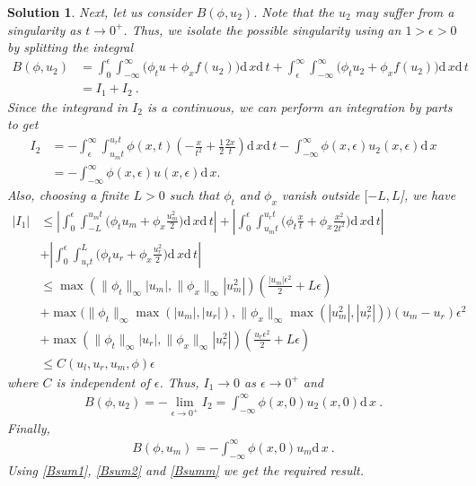 \documentclass[10pt,letterpaper]{article}
\newcommand{\dif}[1][]{\mathrm{d} {#1}\,}
\newcommand{\frb}[1]{ \left(  {#1} \right) }
\theoremstyle{break}
\newtheorem{solution}{Solution}
\begin{document}
\begin{solution}
	Next, let us consider $B\frb{\phi,u_2}$. Note that the $u_2$ may suffer from a singularity as $t \rightarrow 0^+$. Thus, we isolate the possible singularity using an $1>\epsilon > 0$ by splitting the integral
	\begin{align}
	B\frb{\phi,u_2} &=  \int_0^\epsilon \int_{-\infty}^\infty \Big(\phi_t u +\phi_x f\frb{u_2}\Big)\dif x\dif t +  \int_\epsilon^\infty \int_{-\infty}^\infty \Big(\phi_t u_2 +\phi_x f\frb{u_2}\Big)\dif x\dif t \\
	 & = I_1 + I_2 \ .
	\end{align}
	Since the integrand in $I_2$ is a continuous, we can perform an integration by parts to get
	\begin{align}
	I_2 &= - \int_\epsilon^\infty \int_{u_m t}^{u_r t} \phi(x,t) \left( - \frac{x}{t^2} + \frac{1}{2} \frac{2 x}{t} \right) \dif x \dif t - \int_{-\infty}^\infty \phi(x,\epsilon) u_2(x,\epsilon) \dif x  \\
		& = - \int_{-\infty}^\infty \phi(x,\epsilon) u(x,\epsilon) \dif x.
	\end{align}
	Also, choosing a finite $L>0$ such that $\phi_t$ and $\phi_x$ vanish outside $[-L,L$], we have
	\begin{align}
	|I_1| &\leq \left| \int_0^\epsilon \int_{-L}^{u_mt} \Big(\phi_t u_m +\phi_x \frac{u_m^2}{2}\Big)\dif x\dif t \right| + \left| \int_0^\epsilon \int_{u_mt}^{u_rt} \Big(\phi_t \frac{x}{t} +\phi_x \frac{x^2}{2t^2}\Big)\dif x\dif t \right|  \\
	&+ \left| \int_0^\epsilon \int_{u_rt}^L \Big(\phi_t u_r +\phi_x \frac{u_r^2}{2}\Big)\dif x\dif t \right| \\
	&\leq \max{(\|\phi_t\|_\infty|u_m|,\|\phi_x\|_\infty|u_m^2|)} \left( \frac{|u_m| \epsilon^2}{2} + L \epsilon \right) \\
	& + \max{\big(\|\phi_t\|_\infty \max(|u_m|,|u_r|),\|\phi_x\|_\infty \max(|u_m^2|,|u_r^2|)\big)} (u_m - u_r) \epsilon^2 \\
	& + \max{(\|\phi_t\|_\infty|u_r|,\|\phi_x\|_\infty|u_r^2|)} \left( \frac{u_r \epsilon^2}{2} + L \epsilon \right) \\
	& \leq C(u_l,u_r, u_m, \phi) \epsilon
	\end{align}
	where $C$ is independent of $\epsilon$. Thus, $I_1 \rightarrow 0$ as $\epsilon \rightarrow 0^+$ and
	\begin{gather} \label{Bsum2}
		B\frb{\phi,u_2}= - \lim \limits_{\epsilon \rightarrow 0^+} I_2 = \int_{-\infty}^{\infty} \phi(x,0) u_2(x,0) \dif x\ .
	\end{gather}
	Finally, 
	\begin{gather} \label{Bsumm}
		B\frb{\phi,u_m}= - \int_{-\infty}^{\infty} \phi(x,0) u_m \dif x\ .
	\end{gather}
	Using \eqref{Bsum1}, \eqref{Bsum2} and \eqref{Bsumm} we get the required result.
\end{solution}
\end{document}
